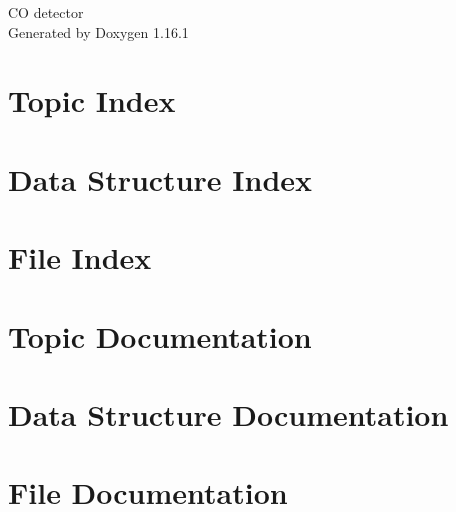 \documentclass[twoside]{book}
\newcommand{\+}{\discretionary{\mbox{\scriptsize$\hookleftarrow$}}{}{}}
\newcommand{\clearemptydoublepage}{%
    \newpage{\pagestyle{empty}\cleardoublepage}%
  }
\begin{document}
  \raggedbottom
    \hypersetup{pageanchor=false,
                bookmarksnumbered=true,
                pdfencoding=unicode
               }
  \begin{titlepage}
  \vspace*{7cm}
  \begin{center}%
  {\Large CO detector}\\
  \vspace*{1cm}
  {\large Generated by Doxygen 1.16.1}\\
  \end{center}
  \end{titlepage}
  \clearemptydoublepage
  \tableofcontents
  \clearemptydoublepage
  \hypersetup{pageanchor=true}
\chapter{Topic Index}

\chapter{Data Structure Index}

\chapter{File Index}

\chapter{Topic Documentation}

\chapter{Data Structure Documentation}










\chapter{File Documentation}



























  \backmatter
  \newpage
  \clearemptydoublepage
  \printindex
\end{document}

